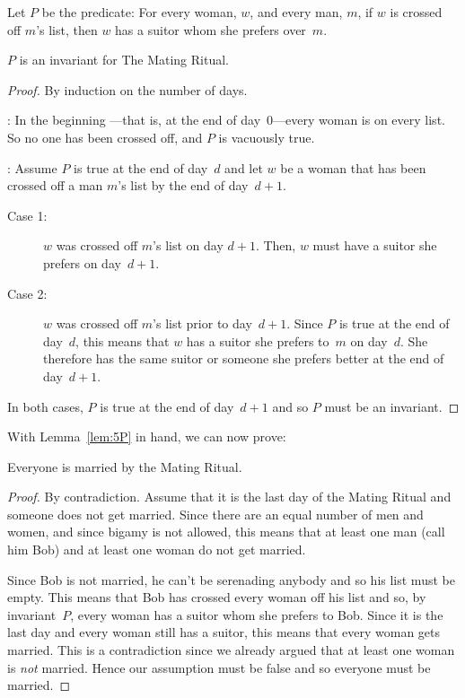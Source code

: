 \begin{definition}\label{def:P8}
Let $P$ be the predicate: For every woman, $w$, and every man, $m$, if
$w$ is crossed off $m$'s list, then $w$ has a suitor whom she prefers
over~$m$.
\end{definition}

\begin{lemma}\label{lem:5P}
$P$ is an invariant for The Mating Ritual.
\end{lemma}

\begin{proof}
By induction on the number of days.

: In the beginning ---that is, at the end of
day~0---every woman is on every list.  So no one has been crossed off, and
$P$ is vacuously true.

: Assume $P$ is true at the end of
day~$d$ and let $w$ be a woman that has been crossed off a man $m$'s
list by the end of day~$d + 1$.

\begin{description}

\item[Case 1:]
$w$ was crossed off $m$'s list on day $d + 1$.  Then, $w$ must have a
  suitor she prefers on day~$d+1$.

\item[Case 2:]
$w$ was crossed off $m$'s list prior to day~$d+1$.  Since $P$ is true
  at the end of day~$d$, this means that $w$ has a suitor she prefers
  to~$m$ on day~$d$.  She therefore has the same suitor or someone she
  prefers better at the end of day~$d + 1$.

\end{description}
In both cases, $P$ is true at the end of day~$d + 1$ and so $P$ must
be an invariant.
\end{proof}

With Lemma~\ref{lem:5P} in hand, we can now prove:

\begin{theorem}
Everyone is married by the Mating Ritual.
\end{theorem}

\begin{proof}
By contradiction. Assume that it is the last day of the Mating Ritual
and someone does not get married.  Since there are an equal number of
men and women, and since bigamy is not allowed, this means that at
least one man (call him Bob) and at least one woman do not get
married.

Since Bob is not married, he can't be serenading anybody and so his
list must be empty.  This means that Bob has crossed every woman off
his list and so, by invariant~$P$, every woman has a suitor whom she
prefers to Bob.  Since it is the last day and every woman still has a
suitor, this means that every woman gets married.  This is a
contradiction since we already argued that at least one woman is
\emph{not} married.  Hence our assumption must be false and so
everyone must be married.
\end{proof}

